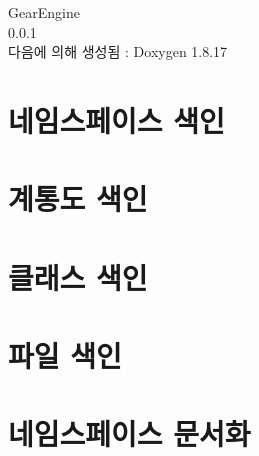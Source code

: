 \let\mypdfximage\pdfximage\def\pdfximage{\immediate\mypdfximage}\documentclass[twoside]{book}
\newcommand{\+}{\discretionary{\mbox{\scriptsize$\hookleftarrow$}}{}{}}
\newcommand{\clearemptydoublepage}{%
  \newpage{\pagestyle{empty}\cleardoublepage}%
}
\begin{document}
\hypersetup{pageanchor=false,
             bookmarksnumbered=true,
             pdfencoding=unicode
            }
\begin{titlepage}
\vspace*{7cm}
\begin{center}%
{\Large Gear\+Engine \\[1ex]\large 0.\+0.\+1 }\\
\vspace*{1cm}
{\large 다음에 의해 생성됨 \+:  Doxygen 1.8.17}\\
\end{center}
\end{titlepage}
\clearemptydoublepage
{}
\tableofcontents
\clearemptydoublepage
{}
\hypersetup{pageanchor=true}

\chapter{네임스페이스 색인}

\chapter{계통도 색인}

\chapter{클래스 색인}

\chapter{파일 색인}

\chapter{네임스페이스 문서화}

\end{document}
